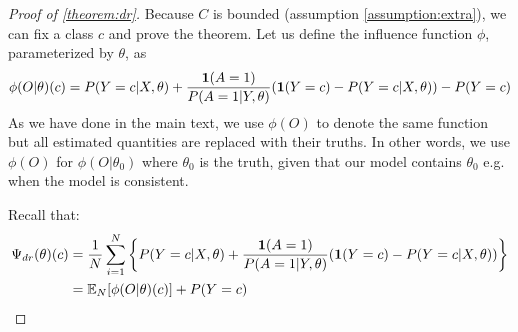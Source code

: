 \begin{proof}[Proof of \cref{theorem:dr}] Because $C$ is bounded (assumption \ref{assumption:extra}), we can fix a class $c$ and prove the theorem.
Let us define the influence function $\phi$, parameterized by $\theta$, as
\begin{equation}
\phi(O | \theta)(c) = P(Y=c|X,\theta) + \frac{\textbf{1}(A=1)}{P(A=1|Y,\theta)} (\textbf{1}(Y=c) - P(Y=c|X,\theta)) - P(Y=c)
\end{equation}
As we have done in the main text, we use $\phi(O)$ to denote the same function but all estimated quantities are replaced with their truths. In other words, we use $\phi(O)$ for $\phi(O|\theta_0)$ where $\theta_0$ is the truth, given that our model contains $\theta_0$ e.g. when the model is consistent.

Recall that:
\begin{equation}
\begin{aligned}
\Psi_{dr}(\theta)(c) &= \frac{1}{N}\sum_{i=1}^N \left\{P(Y=c|X,\theta) + \frac{\textbf{1}(A=1)}{P(A=1|Y,\theta)} (\textbf{1}(Y=c) - P(Y=c|X,\theta))\right\}\\
&= \mathbb{E}_N [\phi(O|\theta)(c)] + P(Y=c)
\end{aligned}
\end{equation}


\end{proof}
